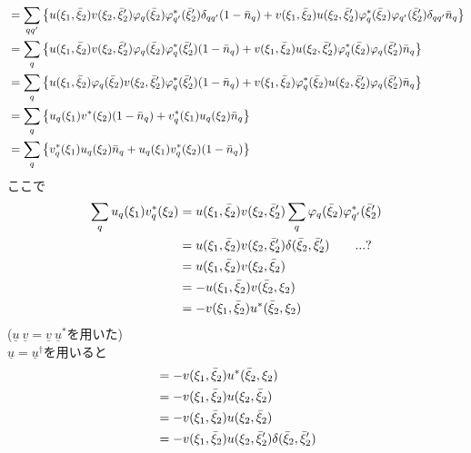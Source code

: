 \documentclass[dvipdfmx, 11pt, a4paper]{jsarticle}
\numberwithin{equation}{section}
\theoremstyle{definition}
\begin{document}
\begin{derivationBox}
\begin{align}
            &=\sum_{qq'} \left\{ u(\xi_1,\bar{\xi}_2)v(\xi_2,\bar{\xi}_2')\varphi_q (\bar{\xi}_2)\varphi_{q'}^*(\bar{\xi}_2')\delta_{qq'}(1-\bar{n}_q) + v(\xi_1,\bar{\xi}_2) u(\xi_2,\bar{\xi}_2')\varphi_q^*(\bar{\xi}_2)\varphi_{q'}(\bar{\xi}_2')\delta_{qq'}\bar{n}_q \right\} \notag \\
            &=\sum_{q} \left\{ u(\xi_1,\bar{\xi}_2)v(\xi_2,\bar{\xi}_2')\varphi_q (\bar{\xi}_2)\varphi_{q}^*(\bar{\xi}_2')(1-\bar{n}_q) + v(\xi_1,\bar{\xi}_2) u(\xi_2,\bar{\xi}_2')\varphi_q^*(\bar{\xi}_2)\varphi_{q}(\bar{\xi}_2')\bar{n}_q \right\} \notag \\
            &=\sum_{q} \left\{ u(\xi_1,\bar{\xi}_2)\varphi_q (\bar{\xi}_2)v(\xi_2,\bar{\xi}_2')\varphi_{q}^*(\bar{\xi}_2')(1-\bar{n}_q) + v(\xi_1,\bar{\xi}_2)\varphi_q^*(\bar{\xi}_2) u(\xi_2,\bar{\xi}_2')\varphi_{q}(\bar{\xi}_2')\bar{n}_q \right\} \notag \\
            &= \sum_q \left\{ u_q(\xi_1) v^*(\xi_2) (1-\bar{n}_q)+ v^*_q(\xi_1)u_q(\xi_2)\bar{n}_q \right\} \notag \\
            &= \sum_q \left\{ v^*_q(\xi_1)u_q(\xi_2)\bar{n}_q + u_q(\xi_1) v^*_q(\xi_2) (1-\bar{n}_q)\right\}
        \end{align}
        ここで
        \begin{align}
            \sum_q u_q(\xi_1)v_q^*(\xi_2) &= u(\xi_1,\bar{\xi}_2)v(\xi_2,\bar{\xi}_2')\sum_q \varphi_q(\bar{\xi}_2)\varphi^*_{q'}(\bar{\xi}_2') \notag \\
            &= u(\xi_1,\bar{\xi}_2)v(\xi_2,\bar{\xi}_2')\delta(\bar{\xi}_2,\bar{\xi}_2')\qquad...? \notag \\
            &=u(\xi_1,\bar{\xi}_2)v(\xi_2,\bar{\xi}_2) \notag \\
            &=-u(\xi_1,\bar{\xi}_2)v(\bar{\xi}_2,\xi_2) \notag \\
            &=-v(\xi_1,\bar{\xi}_2)u^*(\bar{\xi}_2,\xi_2)
        \end{align}
        ($\underline{u}\ \underline{v} = \underline{v}\ \underline{u}^*$を用いた)\\
        $ \underline{u} = \underline{u}^\dagger$を用いると
        \begin{align}
            &= -v(\xi_1,\bar{\xi}_2)u^*(\bar{\xi}_2,\xi_2) \notag \\
            &= -v(\xi_1,\bar{\xi}_2)u(\xi_2, \bar{\xi}_2) \notag \\
            &= -v(\xi_1,\bar{\xi}_2)u(\xi_2, \bar{\xi}_2) \notag \\
            &= -v(\xi_1,\bar{\xi}_2)u(\xi_2, \bar{\xi}_2') \delta(\bar{\xi}_2,\bar{\xi}_2') \notag \\

\end{align}
\end{derivationBox}
\end{document}
